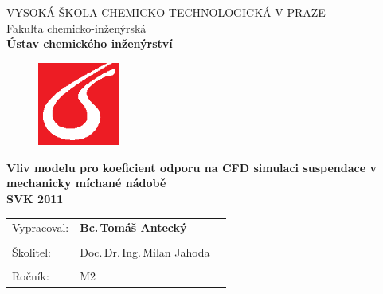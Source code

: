 \begin{center}
{\Large VYSOKÁ ŠKOLA CHEMICKO-TECHNOLOGICKÁ V PRAZE\\}
{\large Fakulta chemicko-inženýrská\\
\textbf{Ústav chemického inženýrství}\\}
\vspace{15mm}

\begin{figure}[!h]
\begin{center}
\includegraphics[angle=0,width=27mm]{images/logo_vscht.eps}
\end{center}
\end{figure}

\vspace{25mm}

{\LARGE \textbf{Vliv modelu pro koeficient odporu na CFD simulaci suspendace v mechanicky míchané nádobě\\}}
\vspace{10mm}
{\Large \textbf{SVK 2011\\}}
\end{center}
\vspace{35mm}

\null
\vfill

\begin{tabular}{p{30mm}lp{50mm}}
Vypracoval: & \textbf{Bc.\,Tomáš Antecký}\\
\\
Školitel: & Doc.\,Dr.\,Ing.\,Milan Jahoda \\
\\
Ročník: & M2 \\


\end{tabular}
